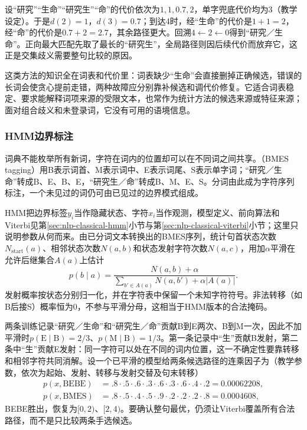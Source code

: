 设“研究”“生命”“研究生”“命”的代价依次为$1,1,0.7,2$，单字兜底代价均为3（教学设定）。于是$d(2)=1$，$d(3)=0.7$；到达4时，经“生命”的代价是$1+1=2$，经“命”的代价是$0.7+2=2.7$，其余路径更大。回溯$4\leftarrow2\leftarrow0$得到“研究／生命”。正向最大匹配先取了最长的“研究生”，全局路径则因后续代价而放弃它，这正是交集歧义需要整句比较的原因。

这类方法的知识全在词表和代价里：词表缺少“生命”会直接删掉正确候选，错误的长词会使贪心提前走错，两种故障应分别靠补候选和调代价修复。它适合词表稳定、要求能解释词项来源的受限文本，也常作为统计方法的候选来源或特征来源；面对组合歧义和未登录词，它没有可用的语境信息。

\subsubsection{HMM边界标注}
\label{sec:nlp-analysis-hmm-boundary}

词典不能枚举所有新词，字符在词内的位置却可以在不同词之间共享。（BMES tagging）用B表示词首、M表示词中、E表示词尾、S表示单字词；“研究／生命”转成B、E、B、E，“研究生／命”转成B、M、E、S。分词由此成为字符序列标注，一个未见过的词仍可由已见过的边界模式组成。

HMM把边界标签$y_i$当作隐藏状态、字符$x_i$当作观测，模型定义、前向算法和Viterbi见第\ref{sec:nlp-classical-hmm}小节与第\ref{sec:nlp-classical-viterbi}小节；这里只说明参数从何而来。由已分词文本转换出的BMES序列，统计句首状态次数$N_{\mathrm{start}}(a)$、相邻状态次数$N(a,b)$和状态发射字符次数$N(a,c)$，用加$\alpha$平滑在允许后继集合$A(a)$上估计
\[
  p(b\mid a)=
  \frac{N(a,b)+\alpha}
       {\sum_{b'\in A(a)}N(a,b')+\alpha|A(a)|}.
\]
发射概率按状态分别归一化，并在字符表中保留一个未知字符符号。非法转移（如B后接S）概率恒为0，不参与平滑分母，这相当于HMM版本的合法掩码。

两条训练记录“研究／生命”和“研究生／命”贡献B到E两次、B到M一次，因此不加平滑时$p(\mathrm E\mid\mathrm B)=2/3$、$p(\mathrm M\mid\mathrm B)=1/3$。第一条记录中“生”贡献B发射，第二条中“生”贡献E发射：同一字符可以处在不同的词内位置，这一不确定性要靠转移和相邻字符共同消解。设一个已平滑的模型给两条候选路径的连乘因子为（教学参数，依次为起始、发射、转移与发射交替及句末转移）
\[
\begin{aligned}
 p(x,\mathrm{BEBE})&=
 .8\cdot.5\cdot.6\cdot.3\cdot.6\cdot.3
 \cdot.6\cdot.4\cdot.2=0.00062208,\\
 p(x,\mathrm{BMES})&=
 .8\cdot.5\cdot.4\cdot.5\cdot.9\cdot.2
 \cdot.2\cdot.2\cdot.8=0.0004608,
\end{aligned}
\]
BEBE胜出，恢复为$[0,2)$、$[2,4)$。要确认整句最优，仍须让Viterbi覆盖所有合法路径，而不是只比较两条手选候选。

